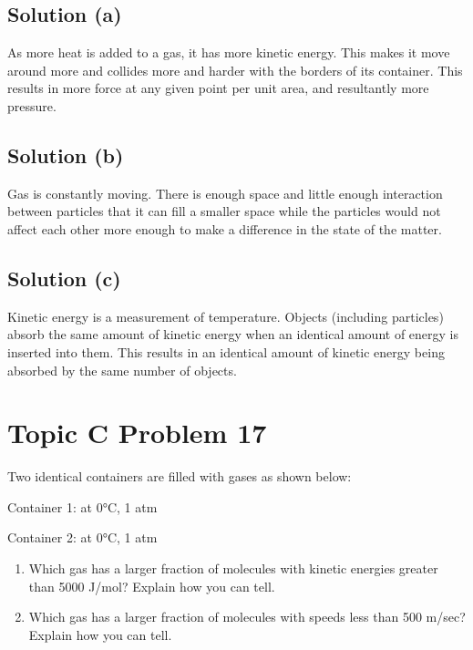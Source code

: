 \documentclass[10pt]{article}
\begin{document}
        \subsection{Solution (a)}
            As more heat is added to a gas, it has more kinetic energy.
            This makes it move around more and collides more and harder with the borders of its container.
            This results in more force at any given point per unit area, and resultantly more pressure.

        \subsection{Solution (b)}
            Gas is constantly moving. 
            There is enough space and little enough interaction between particles that it can fill a smaller space while the particles would not affect each other more enough to make a difference in the state of the matter.

        \subsection{Solution (c)}
            Kinetic energy is a measurement of temperature.
            Objects (including particles) absorb the same amount of kinetic energy when an identical amount of energy is inserted into them.
            This results in an identical amount of kinetic energy being absorbed by the same number of objects. 

    \pagebreak
    \section{Topic C Problem 17}
        Two identical containers are filled with gases as shown below: 
        
        Container 1:  at 0\unit{\celsius}, 1 atm 
        
        Container 2:  at 0\unit{\celsius}, 1 atm

        \begin{enumerate} [label=\alph*)]
            \item Which gas has a larger fraction of molecules with kinetic energies greater than 5000 J/mol? Explain how you can tell.
            \item Which gas has a larger fraction of molecules with speeds less than 500 m/sec? Explain how you can tell.
        \end{enumerate}
\end{document}
